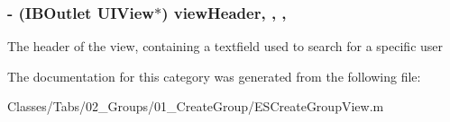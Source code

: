 \subsubsection[{view\+Header}]{\setlength{\rightskip}{0pt plus 5cm}-\/ (I\+B\+Outlet U\+I\+View$\ast$) view\+Header\hspace{0.3cm}{\ttfamily [read]}, {\ttfamily [write]}, {\ttfamily [nonatomic]}, {\ttfamily [strong]}}\label{category_e_s_create_group_view_07_08_aec7f8c0eb97bf847f327282bfed6fab1}
The header of the view, containing a textfield used to search for a specific user 

The documentation for this category was generated from the following file\+:\begin{DoxyCompactItemize}
\item 
Classes/\+Tabs/02\+\_\+\+Groups/01\+\_\+\+Create\+Group/E\+S\+Create\+Group\+View.\+m\end{DoxyCompactItemize}
